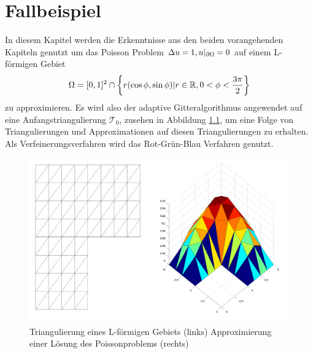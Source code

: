 \chapter{Fallbeispiel}
In diesem Kapitel werden die Erkenntnisse aus den beiden vorangehenden Kapiteln genutzt um das Poisson Problem $\Delta u = 1, u|_{\partial \Omega} = 0$ auf einem L-förmigen Gebiet   
\[
\Omega = [0,1]^2 \cap \left\{ r(\cos\phi,\sin\phi)| r\in\mathbb{R},0<\phi<\frac{3 \pi}{2} \right\}
\] 
zu approximieren. Es wird also der adaptive Gitteralgorithmus angewendet auf eine Anfangstriangulierung $\mathscr{T}_0$, zusehen in Abbildung \ref{grid}, um eine Folge von Triangulierungen und Approximationen auf diesen Triangulierungen zu erhalten. Als Verfeinerungsverfahren wird das Rot-Grün-Blau Verfahren genutzt.

\begin{figure}[!htbp]
	\begin{center}
		\includegraphics[width=13cm]{pics/nonref.png}
	\end{center}
	\caption{\label{grid}Triangulierung eines L-förmigen Gebiets (links) Approximierung einer Lösung des Poissonproblems (rechts)}
\end{figure}

